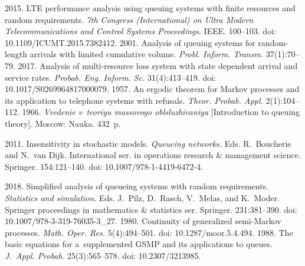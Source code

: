  \begin{multicols}{2}

\renewcommand{\bibname}{\protect\rmfamily References}

{\small\frenchspacing
 {%
 \begin{thebibliography}{9}
 2015. LTE performance analysis using queuing systems with 
finite resources and random requirements. \textit{7th Congress (International) on 
Ultra Modern Telecommunications and Control Systems 
Proceedings}. IEEE. 100--103. doi: 
10.1109/ICUMT.2015.7382412.
 2001. 
Analysis of queuing systems for random-length arrivals with limited 
cumulative volume. \textit{Probl. Inform. 
Transm.} 37(1):70--79.
 2017. Analysis of multi-resource loss 
system with state dependent arrival and service rates. \textit{Probab. 
Eng. Inform. Sc.} 31(4):413--419. doi: 10.1017/S0269964817000079.
 1957. An ergodic 
theorem for Markov processes and its application to telephone systems
with refusals. 
\textit{Theor. Probab. Appl.} 2(1):104--112.
 1966. \textit{Vvedenie 
v~teoriyu massovogo oblsluzhivaniya} [Introduction to queuing theory]. 
Moscow: Nauka. 432~p.

 2011. Insensitivity in stochastic models. \textit{Queueing 
networks.} Eds. R.~Boucherie and  N.~van Dijk. 
International ser. in operations research \& management 
science.  Springer. 154:121--140. doi:  
10.1007/978-1-4419-6472-4.

 2018. 
Simplified analysis of queueing systems with random requirements. 
\textit{Statistics and simulation}. 
Eds. J.~Pilz, D.~Rasch, V.~Melas, and K.~Moder.
Springer proceedings in 
mathematics \& statistics ser.   Springer.
231:381--390. doi: 10.1007/978-3-319-76035-3\_27.
 1980. Continuity of generalized semi-Markov processes. 
\textit{Math. Oper. Res.} 5(4):494--501. doi: 
10.1287/moor.5.4.494.
 1988. The basic equations for 
a~supplemented GSMP and its applications to queues. \textit{J.~Appl. 
Probab.} 25(3):565--578. doi: 10.2307/3213985.
\end{thebibliography}

 }
 }

\end{multicols}

